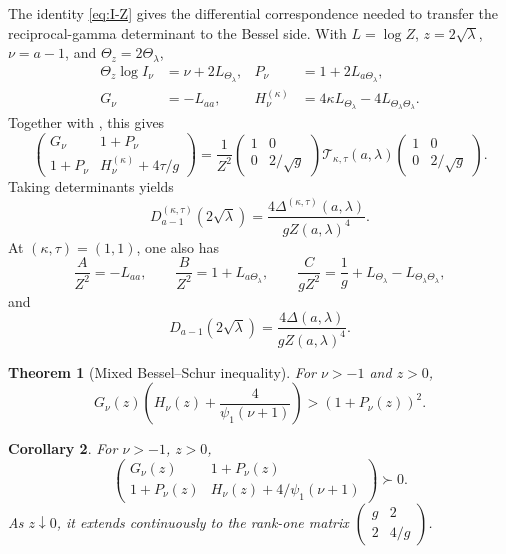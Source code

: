 \documentclass[11pt,a4paper]{amsart}
\numberwithin{equation}{section}
\theoremstyle{plain}
\newtheorem{theorem}{Theorem}[section]
\newtheorem{corollary}[theorem]{Corollary}
\theoremstyle{definition}
\newcommand{\Turan}{\mathcal T}
\newcommand{\Thetal}{\Theta_{\lambda}}
\newcommand{\Thetaz}{\Theta_z}
\begin{document}
The identity \eqref{eq:I-Z} gives the differential correspondence needed
to transfer the reciprocal-gamma determinant to the Bessel side.  With
\(L=\log Z\), \(z=2\sqrt\lambda\), \(\nu=a-1\), and
\(\Thetaz=2\Thetal\),
\begin{align}
 \Thetaz\log I_\nu&=\nu+2L_{\Thetal}, &
 P_\nu&=1+2L_{a\Thetal},\label{eq:U-L}\\
 G_\nu&=-L_{aa}, &
 H_\nu^{(\kappa)}&=4\kappa L_{\Thetal}-4L_{\Thetal\Thetal}.\label{eq:G-L}
\end{align}
Together with , this gives
\begin{equation}\label{eq:bessel-congruence}
 \begin{pmatrix}
  G_\nu&1+P_\nu\\
  1+P_\nu&H_\nu^{(\kappa)}+4\tau/g
 \end{pmatrix}
 =\frac1{Z^2}
 \begin{pmatrix}1&0\\0&2/\sqrt g\end{pmatrix}
 \Turan_{\kappa,\tau}(a,\lambda)
 \begin{pmatrix}1&0\\0&2/\sqrt g\end{pmatrix}.
\end{equation}
Taking determinants yields
\begin{equation}\label{eq:Dkappa-tau-Delta}
 D_{a-1}^{(\kappa,\tau)}(2\sqrt\lambda)
 =\frac{4\Delta^{(\kappa,\tau)}(a,\lambda)}{gZ(a,\lambda)^4}.
\end{equation}
At \((\kappa,\tau)=(1,1)\), one also has
\begin{equation}\label{eq:ABC-log}
 \frac A{Z^2}=-L_{aa},\qquad
 \frac B{Z^2}=1+L_{a\Thetal},\qquad
 \frac C{gZ^2}=\frac1g+L_{\Thetal}-L_{\Thetal\Thetal},
\end{equation}
and
\begin{equation}\label{eq:D-Delta}
 D_{a-1}(2\sqrt\lambda)=\frac{4\Delta(a,\lambda)}{gZ(a,\lambda)^4}.
\end{equation}

\begin{theorem}[Mixed Bessel--Schur inequality]\label{thm:bessel}
For \(\nu>-1\) and \(z>0\),
\begin{equation}\label{eq:bessel-main}
 G_\nu(z)\left(H_\nu(z)+\frac4{\psi_1(\nu+1)}\right)>(1+P_\nu(z))^2.
\end{equation}
\end{theorem}

\begin{corollary}\label{cor:bessel-matrix}
For \(\nu>-1\), \(z>0\),
\[
 \begin{pmatrix}
 G_\nu(z)&1+P_\nu(z)\\
 1+P_\nu(z)&H_\nu(z)+4/\psi_1(\nu+1)
 \end{pmatrix}\succ0.
\]
As \(z\downarrow0\), it extends continuously to the rank-one matrix
\(\left(\begin{smallmatrix}g&2\\2&4/g\end{smallmatrix}\right)\).
\end{corollary}
\end{document}
